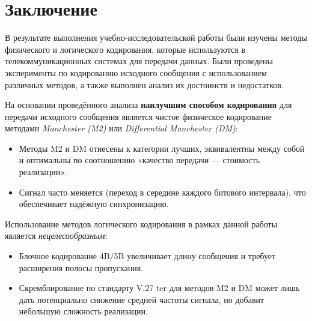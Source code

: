 \section{Заключение}

В результате выполнения учебно-исследовательской работы были изучены методы физического и логического кодирования, которые используются в телекоммуникационных системах для передачи данных. Были проведены эксперименты по кодированию исходного сообщения с использованием различных методов, а также выполнен анализ их достоинств и недостатков.

На основании проведённого анализа \textbf{наилучшим способом кодирования} для передачи исходного сообщения является чистое физическое кодирование методами \textit{Manchester (M2)} или \textit{Differential Manchester (DM)}:
\begin{itemize}
    \item Методы M2 и DM отнесены к категории лучших, эквивалентны между собой и оптимальны по соотношению «качество передачи — стоимость реализации».
    \item Сигнал часто меняется (переход в середине каждого битового интервала), что обеспечивает надёжную синхронизацию.
\end{itemize}

Использование методов логического кодирования в рамках данной работы является \textit{нецелесообразным}:
\begin{itemize}
    \item Блочное кодирование 4B/5B увеличивает длину сообщения и требует расширения полосы пропускания.
    \item Скремблирование по стандарту V.27 ter для методов M2 и DM может лишь дать потенциально снижение средней частоты сигнала, но добавит небольшую сложность реализации.
\end{itemize}